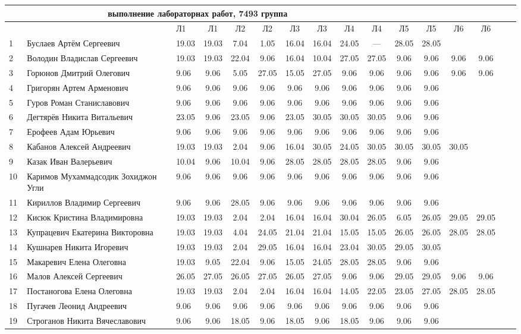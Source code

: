 \documentclass[a4paper,11pt]{article}
\begin{document}
%
\hspace{-6.1cm} %
\begin{tabular}{l|llccccccccccccc}
\multicolumn{10}{c}{выполнение лабораторнах работ, 7493 группа} \\
\toprule
	&&Л1&Л1& Л2&Л2& Л3&Л3& Л4&Л4& Л5&Л5 &Л6&Л6\\ 
\midrule
1\,&Буслаев Артём Сергеевич               &19.03&19.03& 7.04& 1.05&16.04&16.04&24.05& --- &28.05&28.05\\
2\,&Володин Владислав Сергеевич           &19.03&19.03&22.04& 9.06&16.04&10.04&27.05&27.05& 9.06& 9.06& 9.06& 9.06\\
3\,&Горюнов Дмитрий Олегович              & 9.06& 9.06& 5.05&27.05&15.05&27.05& 9.06& 9.06& 9.06 & 9.06& 9.06& 9.06\\
4\,&Григорян Артем Арменович              & 9.06& 9.06& 9.06& 9.06& 9.06& 9.06& 9.06& 9.06& 9.06& 9.06\\
5\,&Гуров Роман Станиславович             & 9.06& 9.06& 9.06& 9.06& 9.06& 9.06& 9.06& 9.06& 9.06& 9.06\\
\midrule
6\,&Дегтярёв Никита Витальевич            &23.05& 9.06&23.05& 9.06&23.05&30.05&30.05&30.05& 9.06& 9.06\\
7\,&Ерофеев Адам Юрьевич                  & 9.06& 9.06& 9.06& 9.06& 9.06& 9.06& 9.06& 9.06& 9.06& 9.06\\
8\,&Кабанов Алексей Андреевич             &19.03&19.03&2.04&  9.06&16.04&30.05&24.05&30.05&30.05&30.05&30.05\\
9\,&Казак Иван Валерьевич                 &10.04& 9.06&10.04& 9.06&28.05&28.05&28.05&28.05& 9.06& 9.06\\
10\,&Каримов Мухаммадсодик Зохиджон Угли  & 9.06& 9.06& 9.06& 9.06& 9.06& 9.06& 9.06& 9.06& 9.06& 9.06\\
\midrule
11\,&Кириллов Владимир Сергеевич          & 9.06& 9.06&28.05& 9.06& 9.06& 9.06& 9.06& 9.06& 9.06& 9.06\\
12\,&Кисюк Кристина Владимировна          &19.03&19.03&2.04 &2.04&16.04&16.04 &30.04&26.05&6.05&26.05&29.05&29.05\\
13\,&Купрацевич Екатерина Викторовна      &19.03&19.03& 4.04&24.05&21.04&21.04&15.05&15.05&26.05&26.05&28.05&28.05\\
14\,&Кушнарев Никита Игоревич             &19.03&19.03& 2.04&29.05&16.04&16.04&23.04&30.05&29.05&30.05\\
15\,&Макаревич Елена Олеговна             &19.03& 9.05&22.04& 9.06&15.05&24.05&28.05&28.05& 9.06& 9.06\\
\midrule
16\,&Малов Алексей Сергеевич              &26.05&27.05&26.05&27.05&26.05&27.05& 9.06& 9.06&29.05&29.05& 9.06& 9.06\\
17\,&Постаногова Елена Олеговна           &19.03&19.03&2.04&2.04&16.04&16.04&14.05&22.05&23.05&27.05&28.05&28.05\\
18\,&Пугачев Леонид Андреевич             & 9.06& 9.06& 9.06& 9.06& 9.06& 9.06& 9.06& 9.06& 9.06& 9.06\\
19\,&Строганов Никита Вячеславович        & 9.06& 9.06&18.05& 9.06&18.05& 9.06&18.05& 9.06& 9.06&9.06\\

\bottomrule
\end{tabular}
\end{document}
